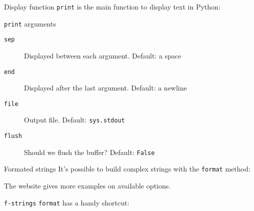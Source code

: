\begin{frame}{Display function}
  \texttt{print} is the main function to display text in Python:

\end{frame}

\begin{frame}{\texttt{print} arguments}
  \begin{description}
    \item[\texttt{sep}] Displayed between each argument. Default: a space
    \item[\texttt{end}] Displayed after the last argument. Default: a newline
    \item[\texttt{file}] Output file. Default: \texttt{sys.stdout}
    \item[\texttt{flush}] Should we flush the buffer? Default: \texttt{False}
  \end{description}

\end{frame}

\begin{frame}{Formated strings}
  It's possible to build complex strings with the \texttt{format} method:


  The website  gives more examples on available options.  
\end{frame}

\begin{frame}{\texttt{f-strings}}
  \texttt{format} has a handy shortcut:

\end{frame}
